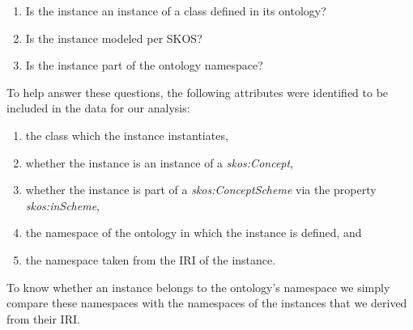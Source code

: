 \begin{enumerate}
    \item Is the instance an instance of a class defined in its ontology?
    \item Is the instance modeled per SKOS?
    \item Is the instance part of the ontology namespace?
\end{enumerate}

To help answer these questions, the following attributes were identified to be included in the data for our analysis:

\begin{flushleft}
\begin{enumerate}
    \item the class which the instance instantiates,
    \item whether the instance is an instance of a \textit{skos:Concept},
    \item whether the instance is part of a \textit{skos:ConceptScheme} via the property \textit{skos:inScheme},
    \item the namespace of the ontology in which the instance is defined, and
    \item the namespace taken from the IRI of the instance.
\end{enumerate}
\end{flushleft}

To know whether an instance belongs to the ontology's namespace we simply compare these namespaces with the namespaces of the instances that we derived from their IRI. %

